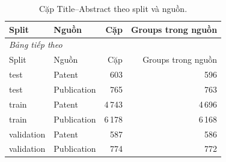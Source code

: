 \begingroup\small\setlength{\tabcolsep}{4pt}\renewcommand{\arraystretch}{1.16}
\begin{longtable}{llrr}
\caption{Cặp Title--Abstract theo split và nguồn.}\label{tab:splits}\\
\toprule Split & Nguồn & Cặp & Groups trong nguồn \\
\midrule\endfirsthead
\multicolumn{4}{l}{\textit{Bảng tiếp theo}}\\
\toprule Split & Nguồn & Cặp & Groups trong nguồn \\
\midrule\endhead
\bottomrule\endfoot
test & Patent & 603 & 596 \\
test & Publication & 765 & 763 \\
train & Patent & 4\,743 & 4\,696 \\
train & Publication & 6\,178 & 6\,168 \\
validation & Patent & 587 & 586 \\
validation & Publication & 774 & 772 \\
\end{longtable}\endgroup
{}

